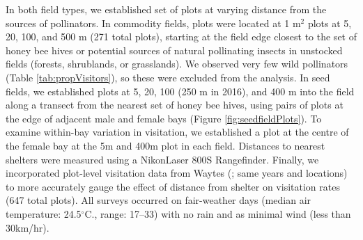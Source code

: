 \documentclass[12pt]{article} %
\begin{document}

In both field types, we established set of plots at varying distance from the sources of pollinators. 
In commodity fields, plots were located at 1 m$^2$ plots at 5, 20, 100, and 500 m (271 total plots), starting at the field edge closest to the set of honey bee hives or potential sources of natural pollinating insects in unstocked fields (forests, shrublands, or grasslands). 
We observed very few wild pollinators (Table \ref{tab:propVisitors}), so these were excluded from the analysis.
In seed fields, we established plots at 5, 20, 100 (250 m in 2016), and 400 m into the field along a transect from the nearest set of honey bee hives, using pairs of plots at the edge of adjacent male and female bays (Figure \ref{fig:seedfieldPlots}).
To examine within-bay variation in visitation, we established a plot at the centre of the female bay at the 5m and 400m plot in each field. 
Distances to nearest shelters were measured using a Nikon\texttrademark Laser 800S Rangefinder.
Finally, we incorporated plot-level visitation data from Waytes (\citeyear{waytesMsc}; same years and locations) to more accurately gauge the effect of distance from shelter on visitation rates (647 total plots).
All surveys occurred on fair-weather days (median air temperature: 24.5$^\circ$C., range: 17--33) with no rain and as minimal wind (less than 30km/hr).
\end{document}
